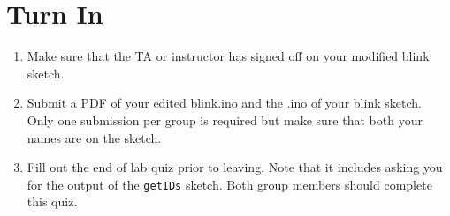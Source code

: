 \section{Turn In}
\begin{enumerate}
    \item Make sure that the TA or instructor has signed off on your modified blink sketch.
    \item Submit a PDF of your edited blink.ino and the .ino of your blink sketch. Only one 
            submission per group is required but make sure that both your names are on the sketch.
    \item Fill out the end of lab quiz prior to leaving. Note that it includes asking you 
            for the output of the \lstinline$getIDs$ sketch. Both group members should complete
            this quiz.
\end{enumerate}
